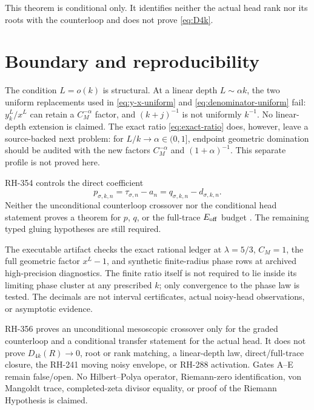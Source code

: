 \documentclass[11pt]{article}
\theoremstyle{remark}
\begin{document}
This theorem is conditional only.  It identifies neither the actual head
rank nor its roots with the counterloop and does not prove
\eqref{eq:D4k}.

\section{Boundary and reproducibility}

The condition $L=o(k)$ is structural.  At a linear depth $L\sim\alpha k$,
the two uniform replacements used in \eqref{eq:y-x-uniform} and
\eqref{eq:denominator-uniform} fail: $y_k^L/x^L$ can retain a
$C_M^{-\alpha}$ factor, and $(k+j)^{-1}$ is not uniformly $k^{-1}$.
No linear-depth extension is claimed.  The exact ratio
\eqref{eq:exact-ratio} does, however, leave a source-backed next problem:
for $L/k\to\alpha\in(0,1]$, endpoint geometric domination should be audited
with the new factors $C_M^{-\alpha}$ and $(1+\alpha)^{-1}$.  This separate
profile is not proved here.

RH-354 controls the direct coefficient
\begin{equation}\label{eq:p-distinction}
 p_{\sigma,k,n}=\tau_{\sigma,n}-a_n
 =q_{\sigma,k,n}-d_{\sigma,k,n}.
\end{equation}
Neither the unconditional counterloop crossover nor the conditional head
statement proves a theorem for $p$, $q$, or the full-trace $E_{\rm off}$
budget \citep{WangDirectTail2026}.  The remaining typed gluing hypotheses
are still required.

The executable artifact checks the exact rational ledger at
$\lambda=5/3$, $C_M=1$, the full geometric factor $x^L-1$, and synthetic
finite-radius phase rows at archived high-precision diagnostics.  The
finite ratio itself is not required to lie inside its limiting phase
cluster at any prescribed $k$; only convergence to the phase law is tested.
The decimals are not interval certificates, actual noisy-head observations,
or asymptotic evidence.

RH-356 proves an unconditional mesoscopic crossover only for the graded
counterloop and a conditional transfer statement for the actual head.
It does not prove $D_{4k}(R)\to0$, root or rank matching, a linear-depth
law, direct/full-trace closure, the RH-241 moving noisy envelope, or RH-288
activation.  Gates A--E remain false/open.  No Hilbert--Polya operator,
Riemann-zero identification, von Mangoldt trace, completed-zeta divisor
equality, or proof of the Riemann Hypothesis is claimed.



\end{document}
